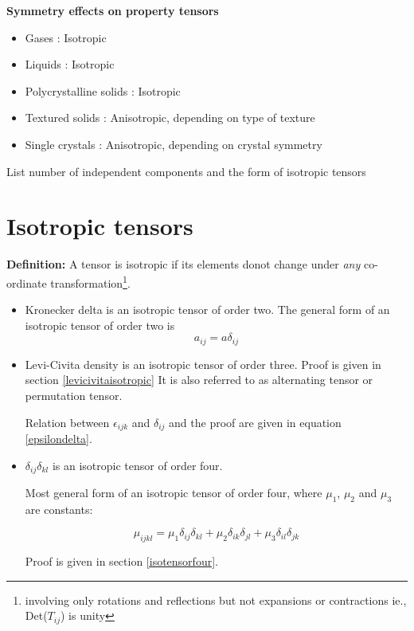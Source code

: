 
{\bf Symmetry effects on property tensors}

\begin{itemize}
\item Gases : Isotropic  
\item Liquids : Isotropic
\item Polycrystalline solids : Isotropic
\item Textured solids : Anisotropic, depending on type of texture
\item Single crystals : Anisotropic, depending on crystal symmetry
\end{itemize}


\begin {lo3} [Tensors]
List number of independent components and the form of isotropic tensors
\end {lo3}

\section{Isotropic tensors}


{\bf Definition:} A tensor is isotropic if its elements donot change under {\em any} co-ordinate transformation\footnote{involving only rotations and reflections but not expansions or contractions ie., Det($T_{ij}$) is unity}.

\begin{itemize}

\item
Kronecker delta is an isotropic tensor of order two. The general form of an isotropic tensor of order two is 
$$ a_{ij} = a \delta_{ij}$$

\item
Levi-Civita density is an isotropic tensor of order three. Proof is given in section \ref{levicivitaisotropic} It is also referred to as alternating tensor or permutation tensor.

Relation between $\epsilon_{ijk}$ and $\delta_{ij}$ and the proof are given in equation \ref{epsilondelta}.

\item
$\delta_{ij}\delta_{kl}$ is an isotropic tensor of order four.

Most general form of an isotropic tensor of order four, where $\mu_1$, $\mu_2$ and $\mu_3$ are constants:

\begin{equation}
\boxed{\mu_{ijkl} = \mu_1\delta_{ij}\delta_{kl} + \mu_2\delta_{ik}\delta_{jl} + \mu_3\delta_{il}\delta_{jk}}
\end{equation} 

Proof is given in section \ref{isotensorfour}.

\end{itemize}


